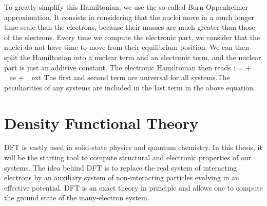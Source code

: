To greatly simplify this Hamiltonian, we use the so-called Born-Oppenheimer approximation. It consists in considering that the nuclei move in a much longer time-scale than the electrons, because their masses are much greater than those of the electrons. Every time we compute the electronic part, we consider that the nuclei do not have time to move from their equilibrium position. \cite{monserrat2018electron} We can then split the Hamiltonian into a nuclear term and an electronic term, and the nuclear part is just an additive constant. The electronic Hamiltonian then reads :
\be
	 =  + _{ee} + _{ext}
\ee
The first and second term are universal for all systems.The peculiarities of any systems are included in the last term in the above equation.

\section{Density Functional Theory}
\acrfull{DFT} is vastly used in solid-state physics and quantum chemistry. In this thesis, it will be the starting tool to compute structural and electronic properties of our systems. The idea behind \acrshort{DFT} is to replace the real system of interacting electrons by an auxiliary system of non-interacting particles evolving in an effective potential. \acrshort{DFT} is an exact theory in principle and allows one to compute the ground state of the many-electron system.

